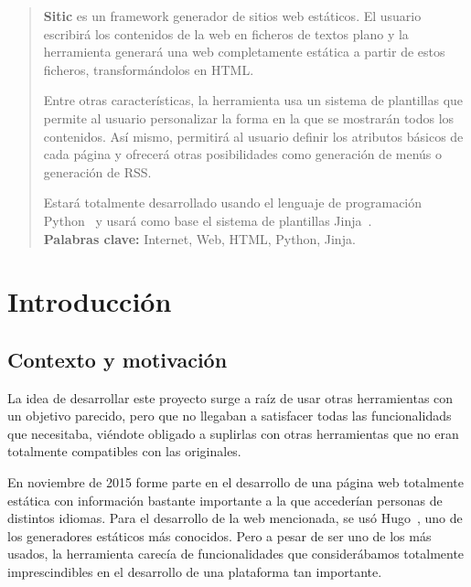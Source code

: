 \documentclass[a4paper,12pt]{article}
\begin{document}
\portada

\vspace{0.25cm}

\begin{abstract}
\textbf{Sitic} es un framework generador de sitios web estáticos. El usuario escribirá
los contenidos de la web en ficheros de textos plano y la
herramienta generará una web completamente estática a partir de estos ficheros,
transformándolos en HTML.

Entre otras características, la herramienta usa un sistema de plantillas que permite al
usuario personalizar la forma en la que se mostrarán todos los contenidos. Así mismo,
permitirá al usuario definir los atributos básicos de cada página y ofrecerá otras
posibilidades como generación de menús o generación de RSS.

Estará totalmente desarrollado usando el lenguaje de programación Python~\cite{python} y usará como
base el sistema de plantillas Jinja~\cite{jinja}. \\

\textbf{Palabras clave:} Internet, Web, HTML, Python, Jinja.

\end{abstract}



\section{Introducción}

\subsection{Contexto y motivación}

La idea de desarrollar este proyecto surge a raíz de usar otras herramientas con un objetivo
parecido, pero que no llegaban a satisfacer todas las funcionalidads que necesitaba, viéndote obligado
a suplirlas con otras herramientas que no eran totalmente compatibles con las originales.

En noviembre de 2015 forme parte en el desarrollo de una página web totalmente estática con información
bastante importante a la que accederían personas de distintos idiomas. Para el desarrollo de la web mencionada,
se usó Hugo~\cite{hugo}, uno de los generadores estáticos más conocidos. Pero a pesar de ser uno de los más usados,
la herramienta carecía de funcionalidades que considerábamos totalmente imprescindibles en el desarrollo
de una plataforma tan importante.
\end{document}
